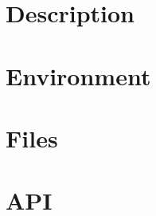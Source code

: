 \documentclass{book}
\begin{document}


\section{Description}


\section{Environment}


\section{Files}


\section{API}

\end{document}
